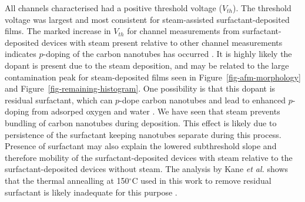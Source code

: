 \documentclass[
  a4paper,
]{scrbook}
\begin{document}
All channels characterised had a positive threshold voltage
(\(V_{th}\)). The threshold voltage was largest and most consistent for
steam-assisted surfactant-deposited films. The marked increase in
\(V_{th}\) for channel measurements from surfactant-deposited devices
with steam present relative to other channel measurements indicates
\(p\)-doping of the carbon nanotubes has occurred
\autocite{Heller2008,Thanihaichelvan2018}. It is highly likely the
dopant is present due to the steam deposition, and may be related to the
large contamination peak for steam-deposited films seen in
Figure~\ref{fig-afm-morphology} and
Figure~\ref{fig-remaining-histogram}. One possibility is that this
dopant is residual surfactant, which can \(p\)-dope carbon nanotubes and
lead to enhanced \(p\)-doping from adsorped oxygen and water
\autocite{Kane2014,Nonoguchi2018}. We have seen that steam prevents
bundling of carbon nanotubes during deposition. This effect is likely
due to persistence of the surfactant keeping nanotubes separate during
this process. Presence of surfactant may also explain the lowered
subthreshold slope and therefore mobility of the surfactant-deposited
devices with steam relative to the surfactant-deposited devices without
steam. The analysis by Kane \emph{et al.} shows that the thermal
annealling at 150\(^\circ\)C used in this work to remove residual
surfactant is likely inadequate for this purpose \autocite{Kane2014}.
\end{document}
